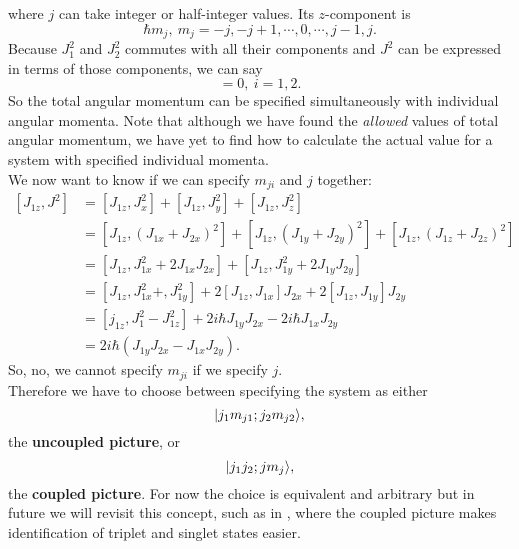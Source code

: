 where $j$ can take integer or half-integer values. Its $z$-component is 
\begin{equation}
\hbar m_j,\ m_j=-j,-j+1,\cdots,0,\cdots,j-1,j. 
\end{equation}
Because $J_1^2$ and $J_2^2$ commutes with all their components and $J^2$ can be 
expressed in terms of those components, we can say 
\begin{equation}
[J^2,J^2_i]=0,\ i=1,2.
\end{equation}
So the total angular momentum can be specified simultaneously with individual 
angular momenta. Note that although we have found the \textit{allowed} values of 
total angular momentum, we have yet to find how to calculate the actual value for 
a system with specified individual momenta. \\
We now want to know if we can specify $m_{ji}$ and $j$ together:
\begin{equation}
\begin{aligned}
[J_{1z},J^2]&=[J_{1z},J_x^2]+[J_{1z},J_y^2]+[J_{1z},J_z^2]\\
&=[J_{1z},(J_{1x}+J_{2x})^2]+[J_{1z},(J_{1y}+J_{2y})^2]+[J_{1z},(J_{1z}+J_{2z})^2]\\
&=[J_{1z},J_{1x}^2+2J_{1x}J_{2x}]+[J_{1z},J_{1y}^2+2J_{1y}J_{2y}]\\
&=[J_{1z},J_{1x}^2+,J_{1y}^2]+2[J_{1z},J_{1x}]J_{2x}+2[J_{1z},J_{1y}]J_{2y}\\
&=[j_{1z},J_1^2-J_{1z}^2]+2i\hbar J_{1y}J_{2x}-2i\hbar J_{1x}J_{2y}\\
&=2i\hbar(J_{1y}J_{2x}-J_{1x}J_{2y}).
\end{aligned}
\end{equation}
So, no, we cannot specify $m_{ji}$ if we specify $j$. \\
Therefore we have to choose between specifying the system as either
\begin{equation}
|j_1m_{j1};j_2m_{j2}\rangle, 
\end{equation}
the \textbf{uncoupled picture}, or
\begin{equation}
|j_1j_2;jm_j\rangle,
\end{equation}
the \textbf{coupled picture}. For now the choice is equivalent and arbitrary but 
in future we will revisit this concept, such as in , where the 
coupled picture makes identification of triplet and singlet states easier. 
